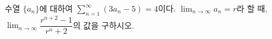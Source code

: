 수열 $\{a_n\}$에 대하여 $\displaystyle\sum_{n=1}^{\infty}(3a_n-5)=4$이다. $\displaystyle\lim_{n\to\infty}a_n=r$라 할 때, $\displaystyle\lim_{n\to\infty}\dfrac{r^{n+2}-1}{r^n+2}$의 값을 구하시오.
